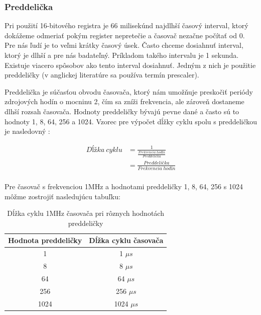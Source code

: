 \subsubsection{Preddelička}

Pri použití 16-bitového registra je 66 milisekúnd najdlhší časový interval, ktorý dokážeme odmeriať pokým register nepretečie a časovač nezačne počítať od 0.
Pre nás ľudí je to veľmi krátky časový úsek. Často chceme dosiahnuť interval, ktorý je dlhší a pre nás badateľný. Príkladom takého intervalu je 1 sekunda.
Existuje viacero spôsobov ako tento interval dosiahnuť. Jedným z nich je použitie preddeličky (v anglickej literatúre sa používa termín prescaler).
\par
Preddelička je súčasťou obvodu časovača, ktorý nám umožňuje preskočiť periódy zdrojových hodín o mocninu 2, čím sa zníži frekvencia,
ale zároveň dostaneme dlhší rozsah časovača.
Hodnoty preddeličky bývajú pevne dané a často sú to hodnoty 1, 8, 64, 256 a 1024. Vzorec pre výpočet dĺžky cyklu spolu s preddeličkou je nasledovný \cite{atmelATmega64012801281}:

\begin{equation} \label{eq:cycle-length}
    \begin{aligned}
        Dĺžka\:cyklu & = \frac{1}{\frac{Frekvencia\:hodín}{Preddelička}} \\
                     & = \frac{Preddelička}{Frekvencia\:hodín}           \\
    \end{aligned}
\end{equation}

Pre časovač s frekvenciou 1MHz a hodnotami preddeličky 1, 8, 64, 256 s 1024 môžme zostrojiť nasledujúcu tabuľku:
\begin{table}[!htbp]
    \begin{center}
        \begin{tabular}{|c|c|}
            \hline
            Hodnota preddeličky & Dĺžka cyklu časovača \\
            \hline
            1                   & 1 $\mu s$            \\
            8                   & 8 $\mu s$            \\
            64                  & 64 $\mu s$           \\
            256                 & 256 $\mu s$          \\
            1024                & 1024 $\mu s$         \\
            \hline
        \end{tabular}
        \caption{Dĺžka cyklu 1MHz časovača pri rôznych hodnotách preddeličky}
        \label{table:timerPrescaler}
    \end{center}
\end{table}

